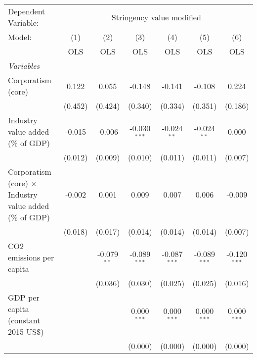 
\begingroup
\centering
\begin{tabular}{lcccccc}
   \toprule
   Dependent Variable: & \multicolumn{6}{c}{Stringency value modified}\\
   Model:                                                         & (1)     & (2)           & (3)            & (4)            & (5)            & (6)\\  
                                                                  &  OLS    & OLS           & OLS            & OLS            & OLS            & OLS\\  
   \midrule
   \emph{Variables}\\
   Corporatism (core)                                             & 0.122   & 0.055         & -0.148         & -0.141         & -0.108         & 0.224\\   
                                                                  & (0.452) & (0.424)       & (0.340)        & (0.334)        & (0.351)        & (0.186)\\   
   Industry value added (\% of GDP)                               & -0.015  & -0.006        & -0.030$^{***}$ & -0.024$^{**}$  & -0.024$^{**}$  & 0.000\\   
                                                                  & (0.012) & (0.009)       & (0.010)        & (0.011)        & (0.011)        & (0.007)\\   
   Corporatism (core) $\times$ Industry value added (\% of GDP)   & -0.002  & 0.001         & 0.009          & 0.007          & 0.006          & -0.009\\   
                                                                  & (0.018) & (0.017)       & (0.014)        & (0.014)        & (0.014)        & (0.007)\\   
   CO2 emissions per capita                                       &         & -0.079$^{**}$ & -0.089$^{***}$ & -0.087$^{***}$ & -0.089$^{***}$ & -0.120$^{***}$\\   
                                                                  &         & (0.036)       & (0.030)        & (0.025)        & (0.025)        & (0.016)\\   
   GDP per capita (constant 2015 US\$)                            &         &               & 0.000$^{***}$  & 0.000$^{***}$  & 0.000$^{***}$  & 0.000$^{***}$\\   
                                                                  &         &               & (0.000)        & (0.000)        & (0.000)        & (0.000)\\   

\end{tabular}
